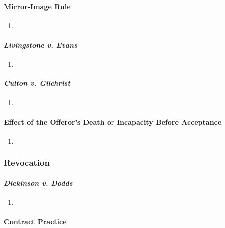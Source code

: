 \paragraph{Mirror-Image Rule}

\begin{enumerate}
    \item %
\end{enumerate}

\paragraph{\emph{Livingstone v. Evans}}

\begin{enumerate}
    \item %
\end{enumerate}

\paragraph{\emph{Culton v. Gilchrist}}

\begin{enumerate}
    \item %
\end{enumerate}

\paragraph{Effect of the Offeror's Death or Incapacity Before Acceptance}

\begin{enumerate}
    \item %
\end{enumerate}

\subsubsection{Revocation}

\paragraph{\emph{Dickinson v. Dodds}}

\begin{enumerate}
    \item %
\end{enumerate}

\paragraph{Contract Practice}

